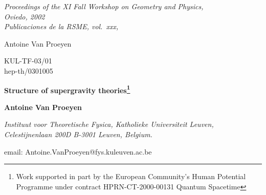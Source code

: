 \documentclass[a4paper,11pt,twoside]{article}
\begin{document}
\label{xyzt}
\leavevmode\vadjust{\vskip -50pt}

{\noindent\sl
Proceedings of the XI Fall Workshop on Geometry and Physics,\\
Oviedo, 2002\\
\rm
Publicaciones de la RSME, vol.~xxx,
}
\null\vskip 10mm


%
%

\pagestyle{myheadings} 
{{\small\sc Antoine Van Proeyen}}


%
%

\thispagestyle{empty}
\begin{flushright}
KUL-TF-03/01\\
hep-th/0301005
\end{flushright}

\begin{center}
{\Large\bf Structure of supergravity theories\footnote{Work supported in
part by the European Community's Human Potential Programme under contract
HPRN-CT-2000-00131 Quantum Spacetime} } \vskip 10mm


%
%

{\large\bf Antoine Van Proeyen } \vskip 5mm {\it
Instituut voor Theoretische Fysica, Katholieke Universiteit Leuven,\\
       Celestijnenlaan 200D B-3001 Leuven, Belgium.


\smallskip

email:  Antoine.VanProeyen@fys.kuleuven.ac.be }
\end{center}

\bigskip


%
%
\end{document}
